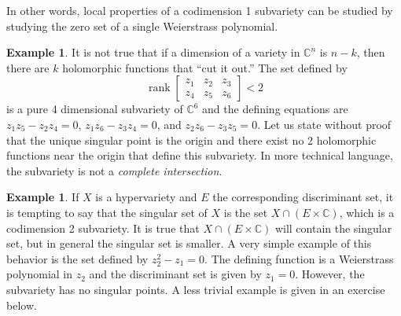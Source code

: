 \documentclass[12pt,openany]{book}
\newcommand{\C}{{\mathbb{C}}}
\newcommand{\rank}{\operatorname{rank}}
\newcommand{\myindex}[1]{#1\index{#1}}
\theoremstyle{plain}
\theoremstyle{remark}
\theoremstyle{definition}
\theoremstyle{exercise}
\theoremstyle{example}
\newtheorem{example}[thm]{Example}
\begin{document}
In other words, local properties of a codimension 1 subvariety can be
studied by studying the zero set of a single Weierstrass polynomial.

\begin{example}
It is not true that
if a dimension of a variety in $\C^n$ is $n-k$, then there are $k$
holomorphic functions that ``cut it out.''
The set defined by
\begin{equation*}
\rank
\begin{bmatrix}
z_1 & z_2 & z_3 \\
z_4 & z_5 & z_6
\end{bmatrix}
< 2
\end{equation*}
is a pure 4 dimensional subvariety of $\C^6$ and the defining equations are
$z_1z_5-z_2z_4 = 0$,
$z_1z_6-z_3z_4 = 0$, and
$z_2z_6-z_3z_5 = 0$.  Let us state without proof that the unique singular point is the origin and there exist
no 2 holomorphic functions near the origin
that define this subvariety.  In more technical
language, the subvariety is not a \emph{\myindex{complete intersection}}.
\end{example}

\begin{example}
If $X$ is a hypervariety and $E$ the corresponding discriminant set,
it is tempting to say that the singular set of $X$ is the
set $X \cap (E \times \C)$, which is a codimension 2 subvariety.  It is true that
$X \cap (E \times \C)$ will contain the singular set, but in general the
singular set is smaller.
A very simple example of this behavior is the set defined by
$z_2^2 - z_1 = 0$.  The defining function is a Weierstrass
polynomial in $z_2$ and the discriminant set is given by $z_1 = 0$.
However, the subvariety has no singular points.  A less trivial example
is given in an exercise below.
\end{example}
\end{document}
